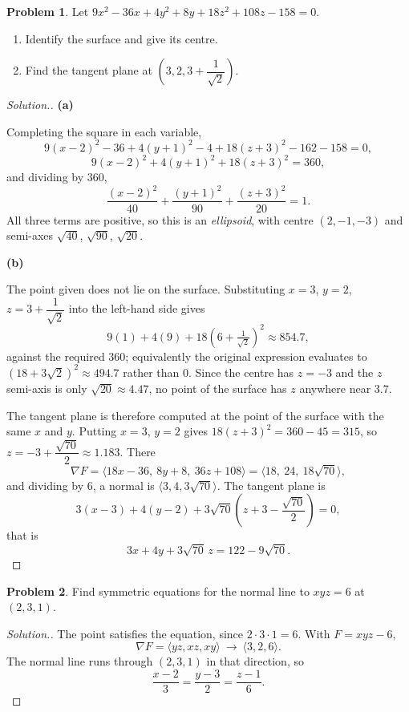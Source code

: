 \documentclass[11pt,a4paper]{article}
\theoremstyle{definition}
\newtheorem{problemx}{Problem}[subsection]
\newenvironment{problem}{\begin{problemx}}{\end{problemx}}
\newenvironment{solution}
  {\renewcommand{\qedsymbol}{}\begin{proof}[\textit{Solution}.]}
  {\end{proof}}
\newcommand{\subhead}[1]{%
  \par\medskip\noindent\textbf{#1}\par\nobreak\smallskip}
\begin{document}
\begin{problem}
Let $9x^2-36x+4y^2+8y+18z^2+108z-158 = 0$.
\begin{enumerate}
\item[(a)] Identify the surface and give its centre.
\item[(b)] Find the tangent plane at
$\left(3, 2, 3+\dfrac{1}{\sqrt2}\right)$.
\end{enumerate}
\end{problem}
\begin{solution}
\subhead{(a)}
Completing the square in each variable,
\[9(x-2)^2 - 36 + 4(y+1)^2 - 4 + 18(z+3)^2 - 162 - 158 = 0 ,\]
\[9(x-2)^2 + 4(y+1)^2 + 18(z+3)^2 = 360 ,\]
and dividing by $360$,
\[\frac{(x-2)^2}{40} + \frac{(y+1)^2}{90} + \frac{(z+3)^2}{20} = 1 .\]
All three terms are positive, so this is an \emph{ellipsoid}, with centre
$(2,-1,-3)$ and semi-axes $\sqrt{40}$, $\sqrt{90}$, $\sqrt{20}$.

\subhead{(b)}
The point given does not lie on the surface. Substituting
$x=3$, $y=2$, $z = 3+\dfrac{1}{\sqrt2}$ into the left-hand side gives
\[9(1) + 4(9) + 18(6+\tfrac{1}{\sqrt2})^2 \approx 854.7 ,\]
against the required $360$; equivalently the original expression evaluates to
$(18+3\sqrt2)^2\approx 494.7$ rather than $0$. Since the centre has
$z=-3$ and the $z$ semi-axis is only $\sqrt{20}\approx 4.47$, no point of the
surface has $z$ anywhere near $3.7$.

The tangent plane is therefore computed at the point of the surface with the
same $x$ and $y$. Putting $x=3$, $y=2$ gives
$18(z+3)^2 = 360-45 = 315$, so $z = -3+\dfrac{\sqrt{70}}{2}\approx 1.183$.
There
\[\nabla F = \langle 18x-36,\ 8y+8,\ 36z+108\rangle
= \langle 18,\ 24,\ 18\sqrt{70}\rangle ,\]
and dividing by $6$, a normal is
$\langle 3, 4, 3\sqrt{70}\rangle$. The tangent plane is
\[3(x-3) + 4(y-2) + 3\sqrt{70}\left(z+3-\frac{\sqrt{70}}{2}\right) = 0 ,\]
that is
\[3x + 4y + 3\sqrt{70}\,z = 122 - 9\sqrt{70} .\]
\end{solution}

\begin{problem}
Find symmetric equations for the normal line to $xyz = 6$ at $(2,3,1)$.
\end{problem}
\begin{solution}
The point satisfies the equation, since $2\cdot 3\cdot 1 = 6$. With
$F = xyz-6$,
\[\nabla F = \langle yz, xz, xy\rangle
\ \longrightarrow\ \langle 3, 2, 6\rangle .\]
The normal line runs through $(2,3,1)$ in that direction, so
\[\frac{x-2}{3} = \frac{y-3}{2} = \frac{z-1}{6}.\]
\end{solution}
\end{document}
